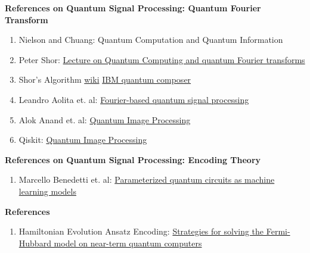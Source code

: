 \documentclass{article}
\begin{document}
\textbf{References on Quantum Signal Processing: Quantum Fourier Transform}
\begin{enumerate}
  \item Nielson and Chuang: Quantum Computation and Quantum Information
  \item Peter Shor: \href{https://www.cl.cam.ac.uk/teaching/1920/QuantComp/Quantum_Computing_Lecture_9.pdf}{Lecture on Quantum Computing
  and quantum Fourier transforms}
  \item Shor's Algorithm \href{https://en.wikipedia.org/wiki/Shor%27s_algorithm}{wiki} \href{https://quantum-computing.ibm.com/composer/docs/iqx/guide/shors-algorithm}{IBM quantum composer} 
  \item Leandro Aolita et. al: \href{https://arxiv.org/abs/2206.02826}{Fourier-based quantum signal processing}
  \item Alok Anand et. al: \href{https://arxiv.org/pdf/2203.01831.pdf}{Quantum Image Processing }
  \item Qiskit: \href{https://qiskit.org/textbook/ch-applications/image-processing-frqi-neqr.html}{Quantum Image Processing}
\end{enumerate}

\textbf{References on Quantum Signal Processing: Encoding Theory }
\begin{enumerate}
  \item Marcello Benedetti et. al: \href{https://iopscience.iop.org/article/10.1088/2058-9565/ab4eb5}{Parameterized quantum circuits as machine learning models
  }
\end{enumerate}

\textbf{References}
\begin{enumerate}
  \item Hamiltonian Evolution Ansatz Encoding: \href{https://journals.aps.org/prb/abstract/10.1103/PhysRevB.102.235122}{Strategies for solving the Fermi-Hubbard model on near-term quantum computers}
\end{enumerate}
\end{document}
